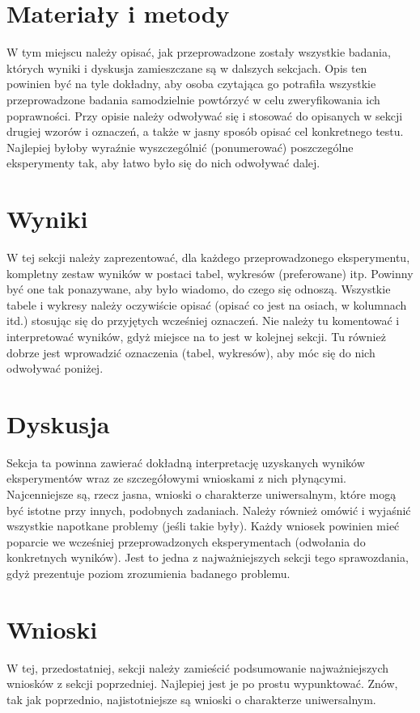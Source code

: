 \documentclass{classrep}
\begin{document}
\section{Materiały i metody}
{\color{blue}
W tym miejscu należy opisać, jak przeprowadzone zostały wszystkie badania,
których wyniki i dyskusja zamieszczane są w dalszych sekcjach. Opis ten
powinien być na tyle dokładny, aby osoba czytająca go potrafiła wszystkie
przeprowadzone badania samodzielnie powtórzyć w celu zweryfikowania ich
poprawności. Przy opisie należy odwoływać się i stosować do
opisanych w sekcji drugiej wzorów i oznaczeń, a także w jasny sposób opisać
cel konkretnego testu. Najlepiej byłoby wyraźnie wyszczególnić (ponumerować)
poszczególne eksperymenty tak, aby łatwo było się do nich odwoływać dalej.}

\section{Wyniki}
{\color{blue}
W tej sekcji należy zaprezentować, dla każdego przeprowadzonego eksperymentu,
kompletny zestaw wyników w postaci tabel, wykresów (preferowane) itp. Powinny
być one tak ponazywane, aby było wiadomo, do czego się odnoszą. Wszystkie
tabele i wykresy należy oczywiście opisać (opisać co jest na osiach, w
kolumnach itd.) stosując się do przyjętych wcześniej oznaczeń. Nie należy tu
komentować i interpretować wyników, gdyż miejsce na to jest w kolejnej sekcji.
Tu również dobrze jest wprowadzić oznaczenia (tabel, wykresów), aby móc się do
nich odwoływać poniżej.}

\section{Dyskusja}
{\color{blue}
Sekcja ta powinna zawierać dokładną interpretację uzyskanych wyników
eksperymentów wraz ze szczegółowymi wnioskami z nich płynącymi. Najcenniejsze
są, rzecz jasna, wnioski o charakterze uniwersalnym, które mogą być istotne
przy innych, podobnych zadaniach. Należy również omówić i wyjaśnić wszystkie
napotkane problemy (jeśli takie były). Każdy wniosek powinien mieć poparcie we
wcześniej przeprowadzonych eksperymentach (odwołania do konkretnych wyników).
Jest to jedna z najważniejszych sekcji tego sprawozdania, gdyż prezentuje
poziom zrozumienia badanego problemu.}

\section{Wnioski}
{\color{blue}
W tej, przedostatniej, sekcji należy zamieścić podsumowanie najważniejszych
wniosków z sekcji poprzedniej. Najlepiej jest je po prostu wypunktować. Znów,
tak jak poprzednio, najistotniejsze są wnioski o charakterze uniwersalnym.}
\end{document}
